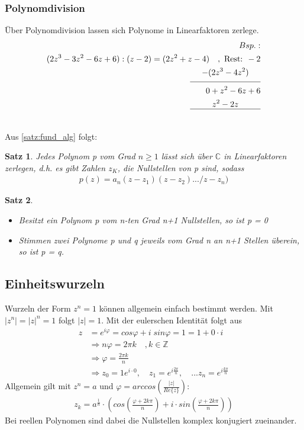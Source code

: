\documentclass[12pt,a4paper]{report}%
\newtheorem{satz}{Satz}[section]
\numberwithin{equation}{section}
\newcommand{\Z}{\mathbb{Z}}
\newcommand{\C}{\mathbb{C}}
\numberwithin{equation}{subsection}
\begin{document}
  \subsubsection{Polynomdivision}
    Über Polynomdivision lassen sich Polynome in Linearfaktoren zerlege. 
    \begin{align}
      Bsp.:  \nonumber\\
      (2z^3 - 3z^2 -6z +6) : (z-2) = (2z^2 +z -4)\quad ,\text{ Rest: } -2 \nonumber\\
      \underset{\text{\rule{3cm}{0.4pt}}}{-(2z^3 - 4z^2)} \nonumber \\
      0 + z^2 - 6z + 6 \nonumber \\
      \qquad \underset{\text{\rule[5mm]{3cm}{0.4pt}}}{z^2-2z} \nonumber \\
    \end{align}
    
    Aus \ref{satz:fund_alg} folgt:
    \begin{satz}
      Jedes Polynom p vom Grad $n\geq 1$ lässt sich über $\C$ in Linearfaktoren zerlegen, d.h. es gibt Zahlen $z_K$, die Nullstellen von p sind, sodass
      \begin{align*}
        p(z) = a_n(z-z_1)(z-z_2).../z-z_n)
      \end{align*}
    \end{satz}
    
    \begin{satz} $\;$
      \begin{itemize}
        \item[a)]
          Besitzt ein Polynom p vom n-ten Grad n+1 Nullstellen, so ist p = 0
        \item[b)]
          Stimmen zwei Polynome p und q jeweils vom Grad n an n+1 Stellen überein, so ist p = q.
      \end{itemize}
    \end{satz}
    
  \subsection{Einheitswurzeln}
  Wurzeln der Form $z^n = 1$ können allgemein einfach bestimmt werden. Mit $|z^n| = |z|^n = 1$ folgt $|z| = 1$. Mit der eulerschen Identität folgt aus
  \begin{align*}
    z &= e^{i\varphi} = cos \varphi + i \; sin\varphi = 1 = 1 + 0 \cdot i\\
    &\Rightarrow n\varphi = 2 \pi k \quad ,k \in \Z\\
    &\Rightarrow \varphi = \frac{2\pi k}{n}\\
    &\Rightarrow z_0 = 1 e^{i\cdot 0},\quad z_1 = e^{i\frac{2\pi}{n}}, \quad ... z_n = e^{i\frac{k\pi}{n}}
  \end{align*}    
  Allgemein gilt mit $z^n = a$ und $\varphi = arccos\left(\frac{|z|}{Re\{z\}}\right)$:
  \begin{align}
    z_k = a^{\frac{1}{n}} \cdot \left(cos\left(\frac{\varphi + 2k\pi}{n}\right) + i\cdot sin\left(\frac{\varphi + 2k\pi}{n}\right)\right)
  \end{align}
  Bei reellen Polynomen sind dabei die Nullstellen komplex konjugiert zueinander.
  \newpage
  
\end{document}
